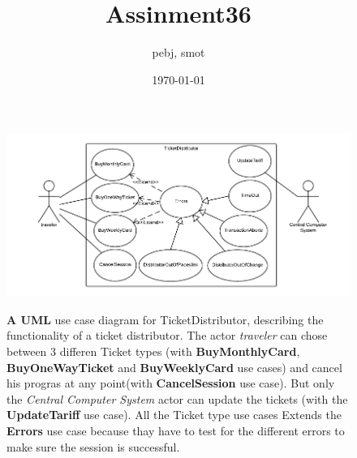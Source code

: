 \documentclass[a4paper]{article}
\title{Assinment36}
\author{pebj, smot}
\date{\today}
\begin{document}
\maketitle
	
	\begin{figure}
		\centering
		\includegraphics[width=1.3\textwidth]{UseCaseDiagram.png}\\
		\caption{\textbf{A UML} use case diagram for TicketDistributor, describing the functionality of a ticket distributor. The actor \textit{traveler} can chose between 3 differen Ticket types (with \textbf{BuyMonthlyCard}, \textbf{BuyOneWayTicket} and \textbf{BuyWeeklyCard} use cases) and cancel his progras at any point(with \textbf{CancelSession} use case). But only the \textit{Central Computer System} actor can update the tickets (with the \textbf{UpdateTariff} use case). All the Ticket type use cases Extends the \textbf{Errors} use case because thay have to test for the different errors to make sure the session is successful.}
		\label{Usecase}
	\end{figure}
	
\end{document}
